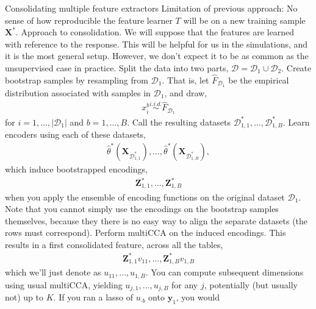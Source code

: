 \documentclass[11pt]{article}
\begin{document}
\begin{outline}
  \2 Consolidating multiple feature extractors
    \3 Limitation of previous approach: No sense of how reproducible the feature
    learner $T$ will be on a new training sample $\mathbf{X}^{\ast}$.
    \3 Approach to consolidation. We will suppose that the features are learned
    with reference to the response. This will be helpful for us in the
    simulations, and it is the most general setup. However, we don't expect it
    to be as common as the unsupervised case in practice.
      \4 Split the data into two parts, $\mathcal{D} = \mathcal{D}_{1} \cup \mathcal{D}_{2}$.
      \4 Create bootstrap samples by resampling from $\mathcal{D}_{1}$. That is,
      let $\hat{F}_{\mathcal{D}_{1}}$ be the empirical distribution associated
      with samples in $\mathcal{D}_{1}$, and draw,
      \begin{align}
        x_{i}^{b} \overset{i.i.d.}{\sim} \hat{F}_{\mathcal{D}_{1}}
      \end{align}
      for $i = 1, \dots, \left|\mathcal{D}_{1}\right|$ and $b = 1, \dots, B$.
      Call the resulting datasets $\mathcal{D}_{1,1}^{\ast}, \dots,
      \mathcal{D}_{1, B}^{\ast}$.
      \4 Learn encoders using each of these datasets,
      \begin{align}
        \hat{\theta}^{\ast}\left(\mathbf{X}_{\mathcal{D}_{1,1}^{\ast}}\right), \dots, \hat{\theta}^{\ast}\left(\mathbf{X}_{\mathcal{D}_{1,B}^{\ast}}\right),
      \end{align}
      which induce bootstrapped encodings,
      \begin{align}
        \mathbf{Z}_{1,1}^{\ast}, \dots, \mathbf{Z}_{1,B}^{\ast}
      \end{align}
      when you apply the ensemble of encoding functions on the original dataset
      $\mathcal{D}_{1}$. Note that you cannot simply use the encodings on the
      bootstrap samples themselves, because they there is no easy way to align
      the separate datasets (the rows must correspond).
      \4 Perform multiCCA on the induced encodings. This results in a first
      consolidated feature, across all the tables,
      \begin{align}
        \mathbf{Z}_{1,1}^{\ast}v_{11}, \dots, \mathbf{Z}_{1, B}^{\ast}v_{1,B}
      \end{align}
      which we'll just denote as $u_{11}, \dots, u_{1,B}$. You can compute
      subsequent dimensions using usual multiCCA, yielding $u_{j,1}, \dots,
      u_{j,B}$ for any $j$, potentially (but usually not) up to $K$.
      \4 If you ran a lasso of $u_{\cdot b}$ onto $\mathbf{y}_{1}$, you would

\end{outline}
\end{document}
